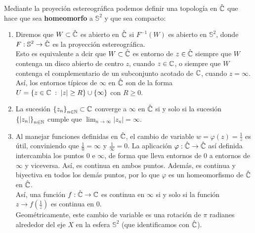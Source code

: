 Mediante la proyeción estereográfica podemos definir una topología en $\displaystyle \hat{\mathbb{C}} $ que hace que sea \textbf{homeomorfo} a $\displaystyle \mathbb{S}^{2} $ y que sea compacto:
\begin{enumerate}
	\item Diremos que $\displaystyle W \subset \hat{\mathbb{C}} $ es abierto en $\displaystyle \hat{\mathbb{C}} $ si $\displaystyle F^{-1}\left(W\right) $ es abierto en $\displaystyle \mathbb{S}^{2} $, donde $\displaystyle F : \mathbb{S}^{2} \to \hat{\mathbb{C}} $ es la proyección estereográfica. \\
		Esto es equivalente a dcir que $\displaystyle W \subset \hat{\mathbb{C}} $ es entorno de $\displaystyle z \in \hat{\mathbb{C}} $ siempre que $\displaystyle W $ contenga un disco abierto de centro $\displaystyle z  $, cuando $\displaystyle z \in \mathbb{C} $, o siempre que $\displaystyle W $ contenga el complementario de un subconjunto acotado de $\displaystyle \mathbb{C} $, cuando $\displaystyle z = \infty  $. \\
		Así, los entornos típicos de $\displaystyle \infty  $ en $\displaystyle \hat{\mathbb{C}} $ son de la forma $\displaystyle U = \left\{ z \in \mathbb{C} \; : \; \left|z\right|\geq R\right\} \cup \left\{ \infty \right\}  $ con $\displaystyle R \geq 0 $.
	\item La sucesión $\displaystyle \left\{ z_{n}\right\} _{n\in\mathbb{N}}\subset \mathbb{C} $ converge a $\displaystyle \infty  $ en $\displaystyle \hat{\mathbb{C}} $ si y solo si la sucesión $\displaystyle \left\{ \left|z_{n}\right|\right\} _{n\in\mathbb{N}} $ cumple que $\displaystyle \lim_{n \to \infty} \left|z_{n}\right|=\infty  $. 
	\item Al manejar funciones definidas en $\displaystyle \hat{\mathbb{C}} $, el cambio de variable $\displaystyle w = \varphi\left(z\right)=\frac{1}{z} $ es útil, conviniendo que $\displaystyle \frac{1}{0}= \infty $ y $\displaystyle \frac{1}{\infty }=0 $. La aplicación $\displaystyle \varphi : \hat{\mathbb{C} }\to \hat{\mathbb{C}} $ así definida intercambia los puntos $\displaystyle 0 $ e $\displaystyle \infty  $, de forma que lleva entornos de $\displaystyle 0 $ a entornos de $\displaystyle \infty  $ y viceversa. Así, es continua en ambos puntos. Además, es continua y biyectiva en todos los demás puntos, por lo que $\displaystyle \varphi $ es un homeomorfismo de $\displaystyle \hat{\mathbb{C}} $ en $\displaystyle \hat{\mathbb{C}} $. \\
		Así, una función $\displaystyle f : \hat{\mathbb{C}} \to \mathbb{C} $ es continua en $\displaystyle \infty $ si y solo si la función $\displaystyle z \to f\left(\frac{1}{z}\right) $ es continua en 0. \\
		Geométricamente, este cambio de variable es una rotación de $\displaystyle \pi  $ radianes alrededor del eje $\displaystyle X $ en la esfera $\displaystyle \mathbb{S}^{2} $ (que identificamos con $\displaystyle \hat{\mathbb{C}} $).
\end{enumerate}

